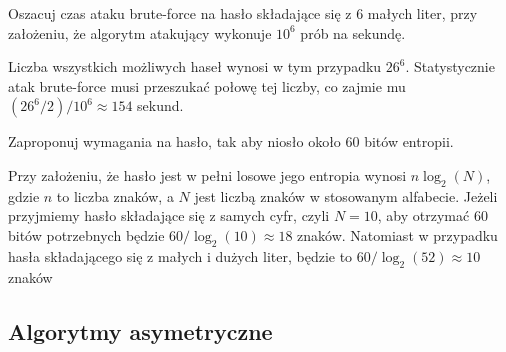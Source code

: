 \documentclass[answers,11pt]{exam}
\begin{document}
\begin{questions}
\question Oszacuj czas ataku brute-force na hasło składające się z 6 małych liter, przy założeniu, że algorytm atakujący wykonuje $10^6$ prób na sekundę.
\begin{solution}
Liczba wszystkich możliwych haseł wynosi w tym przypadku $26^6$. Statystycznie atak brute-force musi przeszukać połowę tej liczby, co zajmie mu $(26^6 / 2 ) / 10^6 \approx 154$ sekund.
\end{solution}

\question Zaproponuj wymagania na hasło, tak aby niosło około 60 bitów entropii.
\begin{solution}
Przy założeniu, że hasło jest w pełni losowe jego entropia wynosi $n \log_2(N)$, gdzie $n$ to liczba znaków, a $N$ jest liczbą znaków w stosowanym alfabecie. Jeżeli przyjmiemy hasło składające się z samych cyfr, czyli $N=10$, aby otrzymać 60 bitów potrzebnych będzie $60/\log_2(10) \approx 18$ znaków. Natomiast w przypadku hasła składającego się z małych i dużych liter, będzie to $60/\log_2(52) \approx 10 $ znaków
\end{solution}


\end{questions}


\subsection{Algorytmy asymetryczne}
\end{document}
